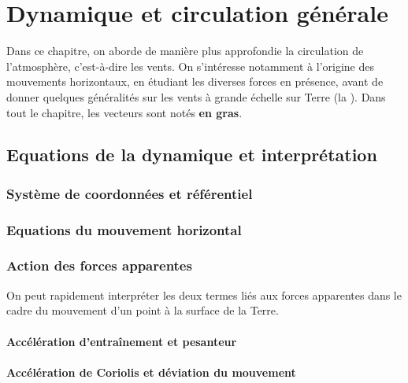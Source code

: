 \chapter{Dynamique et circulation générale}


\bk
Dans ce chapitre, on aborde de manière plus approfondie la circulation de l'atmosphère, c'est-à-dire les vents. On s'intéresse notamment à l'origine des mouvements horizontaux, en étudiant les diverses forces en présence, avant de donner quelques généralités sur les vents à grande échelle sur Terre (la ). Dans tout le chapitre, les vecteurs sont notés \textbf{en gras}.

\mk 
\section{Equations de la dynamique et interprétation}

\sk
\subsection{Système de coordonnées et référentiel}
	

\sk
\subsection{Equations du mouvement horizontal}
	

\sk
\subsection{Action des forces apparentes}

\sk
On peut rapidement interpréter les deux termes liés aux forces apparentes dans le cadre du mouvement d'un point à la surface de la Terre.

\sk
\subsubsection{Accélération d'entraînement et pesanteur}
	

\sk
\subsubsection{Accélération de Coriolis et déviation du mouvement}
	

